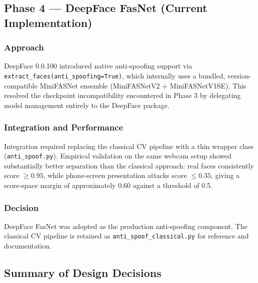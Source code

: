 \documentclass[11pt,a4paper]{article}
\begin{document}
\subsection{Phase 4 --- DeepFace FasNet (Current Implementation)}

\subsubsection{Approach}
DeepFace 0.0.100 introduced native anti-spoofing support via
\texttt{extract\_faces(anti\_spoofing=True)}, which internally uses a bundled,
version-compatible MiniFASNet ensemble (MiniFASNetV2 + MiniFASNetV1SE).
This resolved the checkpoint incompatibility encountered in Phase 3 by delegating
model management entirely to the DeepFace package.

\subsubsection{Integration and Performance}
Integration required replacing the classical CV pipeline with a thin wrapper class
(\texttt{anti\_spoof.py}).
Empirical validation on the same webcam setup showed substantially better separation
than the classical approach: real faces consistently score $\geq 0.95$, while
phone-screen presentation attacks score $\leq 0.35$, giving a score-space margin
of approximately 0.60 against a threshold of 0.5.

\subsubsection{Decision}
DeepFace FasNet was adopted as the production anti-spoofing component.
The classical CV pipeline is retained as \texttt{anti\_spoof\_classical.py} for
reference and documentation.

\subsection{Summary of Design Decisions}
\end{document}
